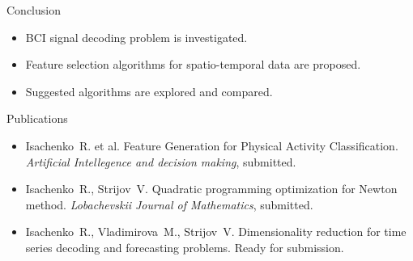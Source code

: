 \documentclass[9pt]{beamer}
\begin{document}
\begin{frame}{Conclusion}
	\begin{itemize}
		\item BCI signal decoding problem is investigated.
		\item Feature selection algorithms for spatio-temporal data are proposed.
		\item Suggested algorithms are explored and compared.
	\end{itemize}
	\begin{block}{Publications}
		\begin{itemize}
			\item Isachenko~R. et al. Feature Generation for Physical Activity Classification. \emph{Artificial Intellegence and decision making}, submitted.
			\item Isachenko~R., Strijov~V. Quadratic programming optimization for Newton method. \emph{Lobachevskii Journal of Mathematics}, submitted.
			\item Isachenko~R., Vladimirova~M., Strijov~V. Dimensionality reduction for time series decoding and forecasting problems. Ready for submission.
		\end{itemize}
	\end{block}
\end{frame}
\begin{frame}{}
\end{frame}
\end{document}
